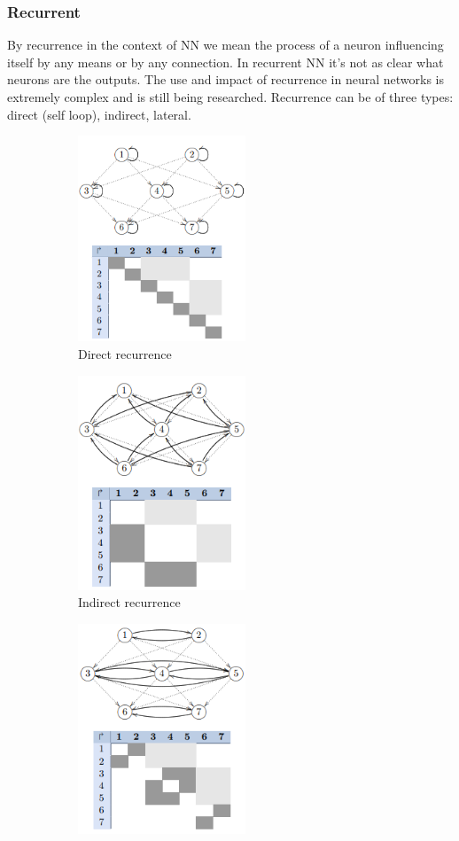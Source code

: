 \subsubsection{Recurrent}
By recurrence in the context of NN we mean the process of a neuron influencing itself by any means or by any connection.
In recurrent NN it's not as clear what neurons are the outputs. The use and impact of recurrence in neural networks is extremely complex and is still being researched. Recurrence can be of three types: direct (self loop), indirect, lateral.
\begin{figure}[htbp]
    \centering
    \begin{subfigure}{6cm}
      \centering
      \includegraphics[width=5cm]{Learning Paradigms/direct_recurrence.png}
      \caption{Direct recurrence}
      \label{fig:sub1}
    \end{subfigure}%
    \begin{subfigure}{6cm}
      \centering
      \includegraphics[width =5cm]{Learning Paradigms/indirect_recurrence.png}
      \caption{Indirect recurrence}
      \label{fig:sub2}
    \end{subfigure}
    \begin{subfigure}{6cm}
        \centering
        \includegraphics[width =5cm]{Learning Paradigms/lateral_recurrence.png}

\end{subfigure}
\end{figure}
